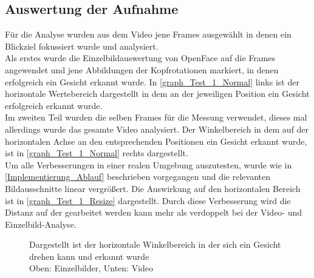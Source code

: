\subsection{Auswertung der Aufnahme}
Für die Analyse wurden aus dem Video jene Frames ausgewählt in denen ein Blickziel fokussiert wurde und analysiert.\\
Als erstes wurde die Einzelbildauswertung von OpenFace auf die Frames angewendet und jene Abbildungen der Kopfrotationen markiert, in denen erfolgreich ein Gesicht erkannt wurde. In \autoref{graph_Test_1_Normal} links ist der horizontale Wertebereich dargestellt in dem an der jeweiligen Position ein Gesicht erfolgreich erkannt wurde.\\
Im zweiten Teil wurden die selben Frames für die Messung verwendet, dieses mal allerdings wurde das gesamte Video analysiert. Der Winkelbereich in dem auf der horizontalen Achse an den entsprechenden Positionen ein Gesicht erkannt wurde, ist in \autoref{graph_Test_1_Normal} rechts dargestellt.\\
Um alle Verbesserungen in einer realen Umgebung auszutesten, wurde wie in \autoref{Implementierung_Ablauf} beschrieben vorgegangen und die relevanten Bildausschnitte linear vergrößert. Die Auswirkung auf den horizontalen Bereich ist in \autoref{graph_Test_1_Resize} dargestellt. Durch diese Verbesserung wird die Distanz auf der gearbeitet werden kann mehr als verdoppelt bei der Video- und Einzelbild-Analyse.
\begin{figure}
	\centering
	
	
	\caption{Dargestellt ist der horizontale Winkelbereich in der sich ein Gesicht drehen kann und erkannt wurde\\
	Oben: Einzelbilder, Unten: Video}
	\label{graph_Test_1_Normal}
\end{figure}
